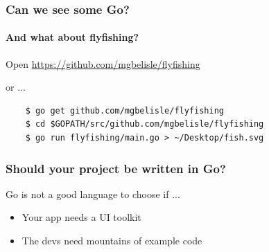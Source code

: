 \documentclass{beamer}
\begin{document}
\begin{frame}[fragile]
  \frametitle{Can we see some Go?}
  \framesubtitle{And what about flyfishing?}
  \begin{center}
    Open \url{https://github.com/mgbelisle/flyfishing}
    \bigskip

    or ...
  \end{center}  
  \begin{verbatim}
    $ go get github.com/mgbelisle/flyfishing
    $ cd $GOPATH/src/github.com/mgbelisle/flyfishing
    $ go run flyfishing/main.go > ~/Desktop/fish.svg
  \end{verbatim}
\end{frame}
\begin{frame}
  \frametitle{Should your project be written in Go?}
  Go is not a good language to choose if ...
  \begin{itemize}
    \item Your app needs a UI toolkit
    \item The devs need mountains of example code
  \end{itemize}
\end{frame}
\end{document}
